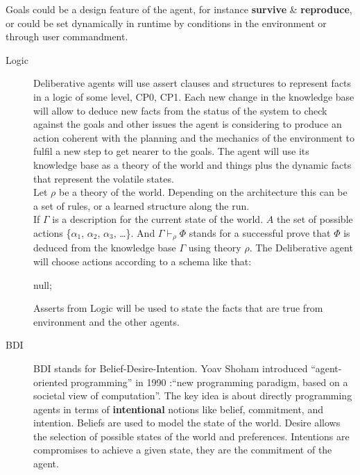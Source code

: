 \documentclass[11pt,oneside,a4paper,openright]{report}
\begin{document}
\begin{description}
	Goals could be a design feature of the agent, for instance \textbf{survive} \& \textbf{reproduce}, or could 
	be set dynamically in runtime by conditions in the environment or through user commandment.

	\begin{description} 
		\item [Logic] Deliberative agents will use assert clauses and structures to represent facts in 
		a logic of some level, CP0, CP1. Each new change in the knowledge base will allow to deduce
		new facts from the status of the system to check against the goals and other issues the agent
		is considering to produce an action coherent with the planning and the mechanics of the environment
		to fulfil a new step to get nearer to the goals.
		The agent will use its knowledge base as a theory of the world and things plus the dynamic facts
		that represent the volatile states.\\
		Let $\rho$ be a theory of the world. Depending on the architecture this can be a set of rules,
		or a learned structure along the run.\\ 
		If $\Gamma$ is a description for the current state of the world. $A$ the set of possible actions 
		\{$\alpha_1$, $\alpha_2$, $\alpha_3$, \ldots\}. And $\Gamma \vdash_{\rho} \Phi$ stands for a successful 
		prove that $\Phi$ is deduced from the knowledge base $\Gamma$ using theory $\rho$. The Deliberative 
		agent will choose actions according to a schema like that:

		\begin{algorithm}[H]

		\Return null;
		\end{algorithm}

		Asserts from Logic will be used to state the facts that are true from environment
		and the other agents.
		
		\item [BDI] BDI stands for Belief-Desire-Intention. Yoav Shoham introduced “agent-oriented 
		programming” in 1990 \cite{Shoham1990}:“new programming paradigm, based on a societal view of
		computation”. The key idea is about directly programming agents in terms of \textbf{intentional}
		notions like belief, commitment, and intention.	Beliefs are used to model the state of the world.
		Desire allows the selection of possible states of the world and preferences. Intentions are 
		compromises to achieve a given state, they are the commitment of the agent.


\end{description}
\end{description}
\end{document}
